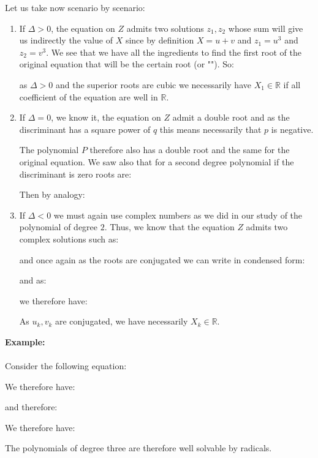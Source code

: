 	Let us take now scenario by scenario:
	\begin{enumerate}
		\item If $\Delta >0$, the equation on $Z$ admits two solutions $z_1,z_2$ whose sum will give us indirectly the value of $X$ since by definition $X=u+v$ and $z_1=u^3$ and $z_2=v^3$. We see that we have all the ingredients to find the first root of the original equation that will be the certain root (or ""). So:
		
		as $\Delta>0$ and the superior roots are cubic we necessarily have $X_1\in \mathbb{R}$ if all coefficient of the equation are well in $\mathbb{R}$.
		
		\item If $\Delta=0$, we know it, the equation on $Z$ admit a double root and as the discriminant has a square power of $q$ this means necessarily that $p$ is negative.

		The polynomial $P$ therefore also has a double root and the same for the original equation. We saw also that for a second degree polynomial if the discriminant is zero roots are:
		
		Then by analogy:
		
		
		\item If $\Delta<0$ we must again use complex numbers as we did in our study of the polynomial of degree $2$. Thus, we know that the equation $Z$ admits two complex solutions such as:
		
		and once again as the roots are conjugated we can write in condensed form:
		
		and as:
		
		we therefore have:
		
		As $u_k,v_k$ are conjugated, we have necessarily $X_k\in \mathbb{R}$.
	\end{enumerate}
	
	\begin{tcolorbox}[colframe=black,colback=white,sharp corners]
	\textbf{{\Large {}}Example:}\\\\
	Consider the following equation:
	
	We therefore have:
	
	and therefore:
	
	We therefore have:
	
	\end{tcolorbox}
	The polynomials of degree three are therefore well solvable by radicals.
	
